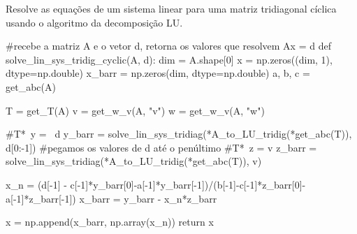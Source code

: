 \documentclass{article}
\begin{document}
Resolve as equações de um sistema linear para uma matriz tridiagonal cíclica usando o algoritmo da decomposição LU. 

\begin{python}
#recebe a matriz A e o vetor d, retorna os valores que resolvem Ax = d
def solve_lin_sys_tridig_cyclic(A, d):
    dim = A.shape[0]
    x = np.zeros((dim, 1), dtype=np.double)
    x_barr = np.zeros(dim, dtype=np.double)
    a, b, c = get_abc(A)

    T = get_T(A)
    v = get_w_v(A, "v")
    w = get_w_v(A, "w")

    #T*~y = ~d
    y_barr = solve_lin_sys_tridiag(*A_to_LU_tridig(*get_abc(T)), d[0:-1]) #pegamos os valores de d até o penúltimo
    #T*~z = v
    z_barr = solve_lin_sys_tridiag(*A_to_LU_tridig(*get_abc(T)), v)

    
    x_n = (d[-1] - c[-1]*y_barr[0]-a[-1]*y_barr[-1])/(b[-1]-c[-1]*z_barr[0]-a[-1]*z_barr[-1])
    x_barr = y_barr - x_n*z_barr

    x = np.append(x_barr, np.array(x_n))
    return x
\end{python}
\end{document}
